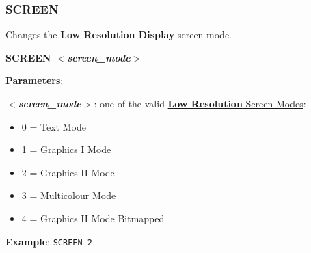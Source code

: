 \documentclass[a4paper,11pt]{article}
\begin{document}
    \subsubsection{{\color{blue}SCREEN}}
    Changes the \textbf{Low Resolution Display} screen mode.

    \hspace{1.9cm}\textbf{SCREEN \textit{$<$screen\_mode$>$}}

    \textbf{Parameters}:

    \hspace{1cm}\textbf{\textit{$<$screen\_mode$>$}}: one of the valid
    \hyperref[sec:vdpscrmodes]{\textbf{Low Resolution} Screen Modes}:

    \begin{itemize}
        \item 0 = Text Mode
        \item 1 = Graphics I Mode
        \item 2 = Graphics II Mode
        \item 3 = Multicolour Mode
        \item 4 = Graphics II Mode Bitmapped
    \end{itemize}

    \textbf{Example}: \texttt{SCREEN 2}



\end{document}
